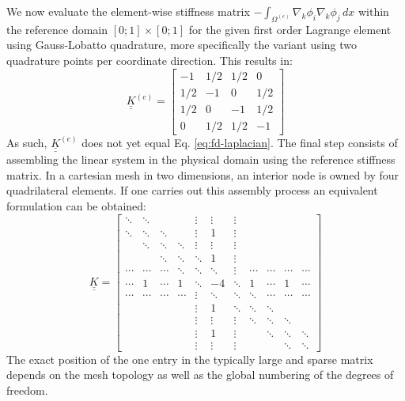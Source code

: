 \documentclass[asi,article,submit,moreauthors]{Definitions/mdpi}
\begin{document}
We now evaluate the element-wise stiffness matrix $-\int_{\Omega^{(e)}} \nabla_k \phi_i \nabla_k \phi_j \,dx$ within the reference domain $\left[0;1\right]\times\left[0;1\right]$ for the given first order Lagrange element using Gauss-Lobatto quadrature, more specifically the variant using two quadrature points per coordinate direction.
This results in:
\begin{equation}
    \underline{\underline{K}}^{(e)} = \begin{bmatrix}
         -1  & 1/2  & 1/2  & 0 \\
         1/2 &  -1  & 0    &  1/2 \\
         1/2 & 0    & -1   &  1/2 \\
        0    &  1/2 &  1/2 & -1
    \end{bmatrix}
\end{equation}
As such, $\underline{\underline{K}}^{(e)}$ does not yet equal Eq. \ref{eq:fd-laplacian}.
The final step consists of assembling the linear system in the physical domain using the reference stiffness matrix.
In a cartesian mesh in two dimensions, an interior node is owned by four quadrilateral elements.
If one carries out this assembly process an equivalent formulation can be obtained:
\begin{equation}
    \underline{\underline{K}} = \begin{bmatrix}
        \ddots & \ddots &  &  & \vdots & \vdots & \vdots &  &  &  &  \\
        \ddots & \ddots & \ddots &  & \vdots & 1 & \vdots &  &  &  &  \\
         & \ddots & \ddots & \ddots & \vdots & \vdots & \vdots &  &  &  &  \\
         &  & \ddots & \ddots & \ddots & 1 & \vdots &  &  &  &  \\
        \cdots & \cdots & \cdots & \ddots & \ddots & \ddots & \vdots & \cdots & \cdots & \cdots & \cdots \\
        \cdots & 1 & \cdots & 1 & \ddots & -4 & \ddots & 1 & \cdots & 1 & \cdots \\
        \cdots & \cdots & \cdots & \cdots & \vdots & \ddots & \ddots & \ddots & \cdots & \cdots & \cdots \\
         &  &  &  & \vdots & 1 & \ddots & \ddots & \ddots &  &  \\
         &  &  &  & \vdots & \vdots & \vdots & \ddots & \ddots & \ddots &  \\
         &  &  &  & \vdots & 1 & \vdots &  & \ddots & \ddots & \ddots \\
         &  &  &  & \vdots & \vdots & \vdots &  &  & \ddots & \ddots 
        \end{bmatrix}
\end{equation}
The exact position of the one entry in the typically large and sparse matrix depends on the mesh topology as well as the global numbering of the degrees of freedom.
\end{document}
